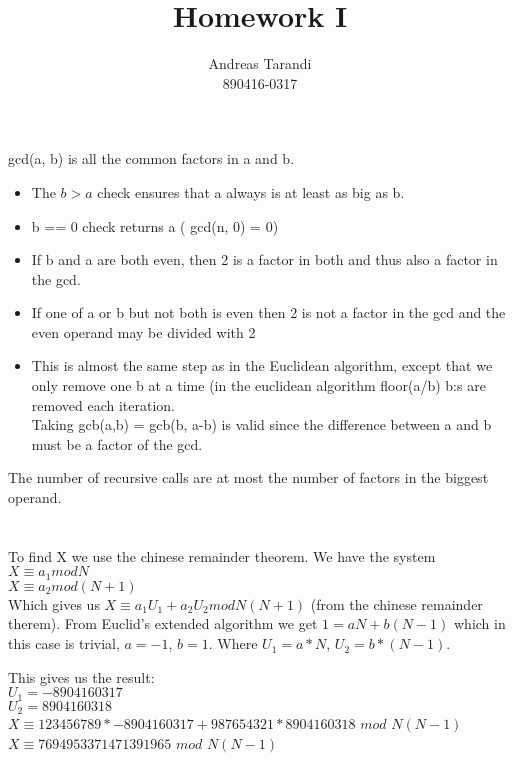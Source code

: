 \documentclass[a4paper,11pt]{article}
\author{Andreas Tarandi\\890416-0317}
\title{Homework I}
\begin{document}
	\maketitle

	\section{}
		gcd(a, b) is all the common factors in a and b.
		\begin{itemize}
			\item The $b > a$ check ensures that a always is at least as big as b. 
			\item b == 0 check returns a ( gcd(n, 0) = 0)
			\item If b and a are both even, then 2 is a factor in both and thus also a factor in the gcd.
			\item If one of a or b but not both is even then 2 is not a factor in the gcd and the even operand may be divided with 2
			\item This is almost the same step as in the Euclidean algorithm, except that we only remove one b at a time (in the euclidean algorithm floor(a/b) b:s are removed each iteration. \\
				Taking gcb(a,b) = gcb(b, a-b) is valid since the difference between a and b must be a factor of the gcd.
		\end{itemize}

		The number of recursive calls are at most the number of factors in the biggest operand.
		
	\section{}
		To find X we use the chinese remainder theorem. We have the system \\
		 $ X \equiv a_1 mod N $\\
		 $ X \equiv a_2 mod (N+1) $\\
		
		Which gives us $ X \equiv a_{1}U_1 + a_{2}U_2 mod N(N+1)$ (from the chinese remainder therem). From Euclid's extended algorithm we get $1 = aN + b(N-1) $ which in this case is trivial, $a = -1$, $b = 1$. Where $U_1 = a*N$, $U_2 = b*(N-1)$.

		This gives us the result:\\
		$U_1 = -8904160317$\\
		$U_2 = 8904160318$\\
		$X \equiv 123456789*-8904160317 + 987654321*8904160318$ $mod$ $N(N-1)$\\
		$X \equiv 7694953371471391965 $ $ mod$ $N(N-1)$\\
\end{document}

